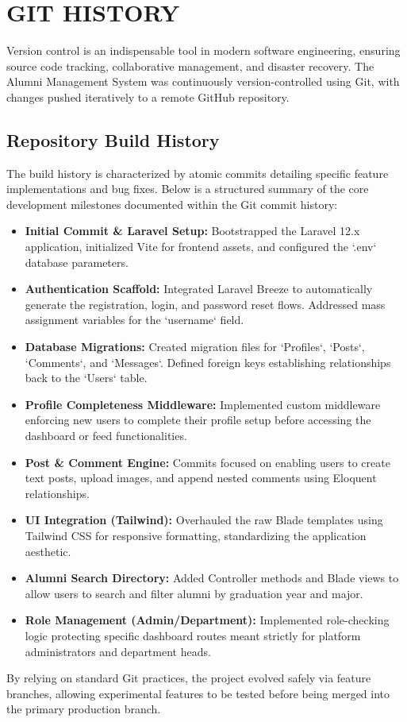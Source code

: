 \chapter{GIT HISTORY}

Version control is an indispensable tool in modern software engineering, ensuring source code tracking, collaborative management, and disaster recovery. The Alumni Management System was continuously version-controlled using Git, with changes pushed iteratively to a remote GitHub repository.

\section{Repository Build History}
The build history is characterized by atomic commits detailing specific feature implementations and bug fixes. Below is a structured summary of the core development milestones documented within the Git commit history:

\begin{itemize}
    \item \textbf{Initial Commit \& Laravel Setup:} Bootstrapped the Laravel 12.x application, initialized Vite for frontend assets, and configured the `.env` database parameters.
    \item \textbf{Authentication Scaffold:} Integrated Laravel Breeze to automatically generate the registration, login, and password reset flows. Addressed mass assignment variables for the `username` field.
    \item \textbf{Database Migrations:} Created migration files for `Profiles`, `Posts`, `Comments`, and `Messages`. Defined foreign keys establishing relationships back to the `Users` table.
    \item \textbf{Profile Completeness Middleware:} Implemented custom middleware enforcing new users to complete their profile setup before accessing the dashboard or feed functionalities.
    \item \textbf{Post \& Comment Engine:} Commits focused on enabling users to create text posts, upload images, and append nested comments using Eloquent relationships.
    \item \textbf{UI Integration (Tailwind):} Overhauled the raw Blade templates using Tailwind CSS for responsive formatting, standardizing the application aesthetic.
    \item \textbf{Alumni Search Directory:} Added Controller methods and Blade views to allow users to search and filter alumni by graduation year and major.
    \item \textbf{Role Management (Admin/Department):} Implemented role-checking logic protecting specific dashboard routes meant strictly for platform administrators and department heads.
\end{itemize}

By relying on standard Git practices, the project evolved safely via feature branches, allowing experimental features to be tested before being merged into the primary production branch.
